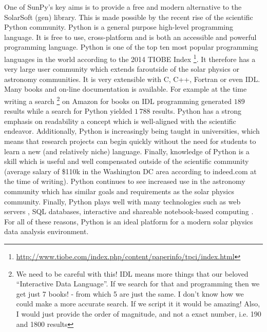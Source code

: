 One of SunPy's key aims is to provide a free and modern alternative 
to the SolarSoft (gen) library. This is made possible by the recent 
rise of the scientific Python community. Python is a general purpose 
high-level programming language. It is free to use, cross-platform 
and is both an accessible and powerful programming language. Python 
is one of the top ten most popular programming languages in the world 
according to the 2014 TIOBE Index 
\footnote{\url{http://www.tiobe.com/index.php/content/paperinfo/tpci/index.html}}.
It therefore has a very large user community which extends faroutside 
of the solar physics or astronomy communities. It is very extensible 
with C, C++, Fortran or even IDL. Many books and on-line 
documentation is available. For example at the time writing a search
\footnote{We need to be careful with this! IDL means more things that
our beloved ``Interactive Data Language''. If we search for that
and programming then we get just 7 books! - from which 5 are just the same.
I don't know how we could make a more accurate search.
If we script it it would be amazing!  Also, I would just provide the order
of magnitude, and not a exact number, i.e. 190 and 1800 results} 
on Amazon for books on IDL programming generated $189$ results while 
a search for Python yielded $1\,788$ results. Python has a strong 
emphasis on readability a concept which is well-aligned with the 
scientific endeavor.
Additionally, Python is increasingly being taught in universities,
which means that research projects can begin quickly 
without the need for students to learn a new (and relatively niche) 
language. Finally, knowledge of Python is a skill which is useful and well 
compensated outside of the scientific community (average salary of 
\$110k in the Washington DC area according to indeed.com at the time 
of writing). Python continues to see increased use in the astronomy 
community \cite{greenfield2011} which has similar goals and 
requirements as the solar physics community. Finally, Python plays 
well with many technologies such as web servers \cite{dolgert2008}, 
SQL databases, interactive and shareable notebook-based computing 
\cite{perez2007}. For all of these reasons, Python is an ideal 
platform for a modern solar physics data analysis environment.


